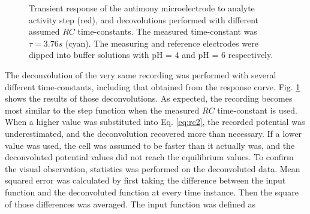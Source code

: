 \begin{figure}
\centering
{}
\caption[]{Transient response of the antimony microelectrode to analyte activity step (red), and decovolutions performed with different assumed $RC$ time-constants.
The measured time-constant was $\tau = 3.76 s$ (cyan).
The measuring and reference electrodes were dipped into buffer solutions with pH = 4 and pH = 6 respectively.}
\label{fig:deconvoluted_transient}
\end{figure}

The deconvolution of the very same recording was performed with several different time-constants, including that obtained from the response curve.
Fig. \ref{fig:deconvoluted_transient} shows the results of those deconvolutions.
As expected, the recording becomes most similar to the step function when the measured $RC$ time-constant is used.
When a higher value was substituted into Eq. \ref{eq:rc2}, the recorded potential was underestimated, and the deconvolution recovered more than necessary.
If a lower value was used, the cell was assumed to be faster than it actually was, and the deconvoluted potential values did not reach the equilibrium values.
To confirm the visual observation, statistics was performed on the deconvoluted data.
Mean squared error was calculated by first taking the difference between the input function and the deconvoluted function at every time instance.
Then the square of those differences was averaged.
The input function was defined as 

